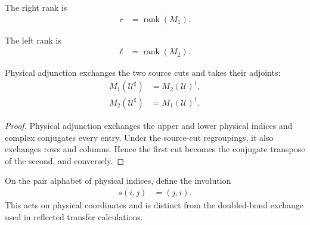 \begin{definition}
    \label{def:mpu_right_rank}
    \leanok
    The right rank is
    \begin{align}
        r & = \operatorname{rank}(M_1).
    \end{align}
\end{definition}

\begin{definition}
    \label{def:mpu_left_rank}
    \leanok
    The left rank is
    \begin{align}
        \ell & = \operatorname{rank}(M_2).
    \end{align}
\end{definition}

\begin{lemma}
    \label{thm:mpu_physical_adjoint_source_cuts}
    \leanok
    Physical adjunction exchanges the two source cuts and takes their adjoints:
    \begin{align}
        M_1(\mathcal U^\sharp) & =M_2(\mathcal U)^\dagger, \\
        M_2(\mathcal U^\sharp) & =M_1(\mathcal U)^\dagger.
    \end{align}
\end{lemma}

\begin{proof}\leanok
    Physical adjunction exchanges the upper and lower physical indices and
    complex conjugates every entry. Under the source-cut regroupings, it also
    exchanges rows and columns. Hence the first cut becomes the conjugate
    transpose of the second, and conversely.
\end{proof}

\begin{definition}
    \label{def:mpu_physical_pair_swap}
    \leanok
    On the pair alphabet of physical indices, define the involution
    \begin{align}
        s(i,j) & =(j,i).
    \end{align}
    This acts on physical coordinates and is distinct from the doubled-bond
    exchange used in reflected transfer calculations.
\end{definition}

